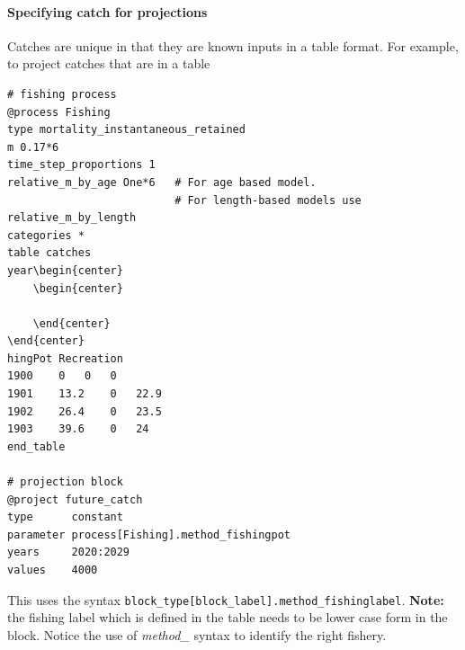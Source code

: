




\paragraph[Catches]{Specifying catch for projections }\label{sec:Project-Catch}

Catches are unique in that they are known inputs in a table format. For example, to project catches that are in a table

{\small{\begin{verbatim}
# fishing process
@process Fishing
type mortality_instantaneous_retained
m 0.17*6
time_step_proportions 1
relative_m_by_age One*6   # For age based model. 
                          # For length-based models use relative_m_by_length
categories *
table catches
year\begin{center}
	\begin{center}
		
	\end{center}
\end{center}
hingPot	Recreation
1900	0	0	0
1901	13.2	0	22.9
1902	26.4	0	23.5
1903	39.6	0	24
end_table

# projection block
@project future_catch
type      constant
parameter process[Fishing].method_fishingpot
years     2020:2029
values    4000
\end{verbatim}}}

This uses the syntax \texttt{block\_type[block\_label].method\_fishinglabel}. \textbf{Note:} the fishing label which is defined in the table needs to be lower case form in the  block. Notice the use of \textit{method\_} syntax to identify the right fishery.
